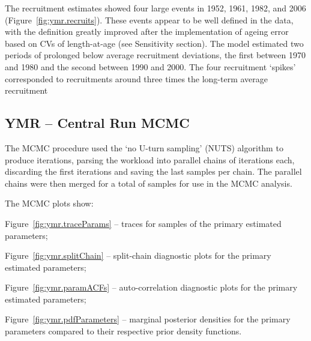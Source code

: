 \documentclass[11pt]{book}
\begin{document}
The recruitment estimates showed four large events in 1952, 1961, 1982, and 2006 (Figure~\ref{fig:ymr.recruits}).
These events appear to be well defined in the data, with the definition greatly improved after the implementation of ageing error based on CVs of length-at-age (see Sensitivity section).
The model estimated two periods of prolonged below average recruitment deviations, the first between 1970 and 1980 and the second between 1990 and 2000.
The four recruitment `spikes' corresponded to recruitments around three times the long-term average recruitment 

\newpage

\graphicspath{{C:/Users/haighr/Files/GFish/PSARC/PSARC_2020s/PSARC21/YMR/Data/SS/YMR2021/Run75/MPD.75.01/english/}}
\clearpage

\subsection{YMR -- Central Run MCMC}


The MCMC procedure used the `no U-turn sampling' (NUTS) algorithm \citep{Monnahan-Kristensen:2018, Monnahan-etal:2019} to produce \nSims{} iterations, parsing the workload into \nChains{} parallel chains \citep{R:2015_snowfall} of \cSims{} iterations each, discarding the first \cBurn{} iterations and saving the last \cSamps{} samples per chain.
The parallel chains were then merged for a total of \Nmcmc{} samples for use in the MCMC analysis.

The MCMC plots show:
\begin{itemize_csas}{}{}
\item Figure~\ref{fig:ymr.traceParams} -- traces for \Nmcmc{} samples of the primary estimated parameters;
\item Figure~\ref{fig:ymr.splitChain} -- split-chain diagnostic plots for the primary estimated parameters;
\item Figure~\ref{fig:ymr.paramACFs} -- auto-correlation diagnostic plots for the primary estimated parameters;
\item Figure~\ref{fig:ymr.pdfParameters} -- marginal posterior densities for the primary parameters compared to their respective prior density functions.
\end{itemize_csas}
\end{document}
